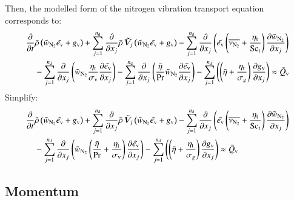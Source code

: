 \documentclass{warpdoc}
\newcommand{\alb}{\vspace{0.2cm}\\} %
\newcommand{\Sct}{{{\rm Sc}_{\rm t}}}
\newcommand{\nd}{{{n}_{\rm d}}}
\newcommand{\turb}{_{\rm t}}
\newcommand{\etat}{{\eta\turb}}
\newcommand{\ev}{e_{\rm v}}
\newcommand{\sigmav}{\sigma_{\rm v}}
\begin{document}
%
Then, the modelled form of the nitrogen vibration transport equation corresponds
to:
%
\begin{align}
 \frac{\partial}{\partial t} &\wbar{\rho} \left( {\wtilde{w}_{\rm N_2}}  \wtilde{\ev} + g_{\rm v}\right)
  + \sum_{j=1}^{\nd} \frac{\partial}{\partial x_j} \wbar{\rho}\, {\wtilde{\bm{V}}_j} \left( {\wtilde{w}_{\rm N_2}} {\wtilde{\ev}} + g_{\rm v}\right)
  -  \sum_{j=1}^{\nd} \frac{\partial}{\partial x_j}\left({\wtilde{\ev}} \left(\overline{\nu_{\rm N_2}}+ \frac{\etat}{\Sct}\right) \frac{\partial {\wtilde{w}_{\rm N_2}}}{\partial x_j}\right)\nonumber\alb
  &-  \sum_{j=1}^{\nd} \frac{\partial}{\partial x_j}\left({\wtilde{w}_{\rm N_2}} \frac{\etat}{\sigmav} \frac{\partial \wtilde{\ev}}{\partial x_j}\right)
      - \sum_{j=1}^{\nd} \frac{\partial }{\partial x_j} \left(
            \frac{\wbar{\eta}}{\Pr} \wtilde{w}_{\rm N_2} \frac{\partial \wtilde{\ev}}{\partial x_j}\right)
   -\sum_{j=1}^{\nd} \left( \left( \wbar{\eta}+\frac{\etat}{\sigma_g} \right) \frac{\partial g_{\rm v}}{\partial x_j} \right)
 \approx \wbar{Q}_{\rm v}
\end{align}
%
Simplify:
%
\begin{align}
 \frac{\partial}{\partial t} &\wbar{\rho} \left( {\wtilde{w}_{\rm N_2}}  \wtilde{\ev} + g_{\rm v}\right)
  + \sum_{j=1}^{\nd} \frac{\partial}{\partial x_j} \wbar{\rho}\, {\wtilde{\bm{V}}_j} \left( {\wtilde{w}_{\rm N_2}} {\wtilde{\ev}} + g_{\rm v}\right)
  -  \sum_{j=1}^{\nd} \frac{\partial}{\partial x_j}\left({\wtilde{\ev}} \left(\overline{\nu_{\rm N_2}}+ \frac{\etat}{\Sct}\right) \frac{\partial {\wtilde{w}_{\rm N_2}}}{\partial x_j}\right)\nonumber\alb
  &-  \sum_{j=1}^{\nd} \frac{\partial}{\partial x_j}\left({\wtilde{w}_{\rm N_2}} \left(\frac{\wbar{\eta}}{\Pr}+\frac{\etat}{\sigmav}\right) \frac{\partial \wtilde{\ev}}{\partial x_j}\right)
   -\sum_{j=1}^{\nd} \left( \left( \wbar{\eta}+\frac{\etat}{\sigma_g} \right) \frac{\partial g_{\rm v}}{\partial x_j} \right)
 \approx \wbar{Q}_{\rm v}
  \label{eqn:NV:modelled:final}
\end{align}
%




\subsection{Momentum}
\end{document}
